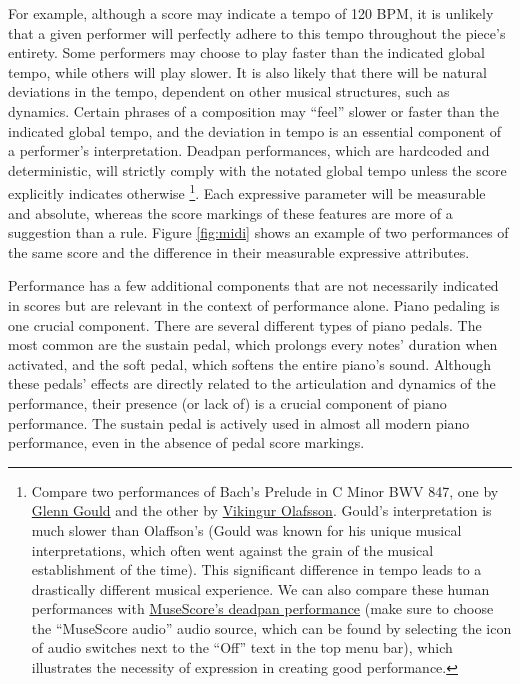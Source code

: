 For example, although a score may indicate a tempo of 120 BPM, it is unlikely that a given performer will perfectly adhere to this tempo throughout the piece's entirety. Some performers may choose to play faster than the indicated global tempo, while others will play slower. It is also likely that there will be natural deviations in the tempo, dependent on other musical structures, such as dynamics. Certain phrases of a composition may ``feel'' slower or faster than the indicated global tempo, and the deviation in tempo is an essential component of a performer's interpretation. Deadpan performances, which are hardcoded and deterministic, will strictly comply with the notated global tempo unless the score explicitly indicates otherwise%
\footnote{Compare two performances of Bach's Prelude in C Minor BWV 847, one by \href{https://www.youtube.com/watch?v=\_3MVZfLReo0}{Glenn Gould} and the other by \href{https://www.youtube.com/watch?v=CGVL5j6BEKs}{Vikingur Olafsson}. Gould's interpretation is much slower than Olaffson's (Gould was known for his unique musical interpretations, which often went against the grain of the musical establishment of the time). This significant difference in tempo leads to a drastically different musical experience. We can also compare these human performances with \href{https://musescore.com/user/30732005/scores/6062802}{MuseScore's deadpan performance} (make sure to choose the ``MuseScore audio'' audio source, which can be found by selecting the icon of audio switches next to the ``Off'' text in the top menu bar), which illustrates the necessity of expression in creating good performance.}. Each expressive parameter will be measurable and absolute, whereas the score markings of these features are more of a suggestion than a rule. Figure \ref{fig:midi} shows an example of two performances of the same score and the difference in their measurable expressive attributes. 

Performance has a few additional components that are not necessarily indicated in scores but are relevant in the context of performance alone. Piano pedaling is one crucial component. There are several different types of piano pedals. The most common are the sustain pedal, which prolongs every notes' duration when activated, and the soft pedal, which softens the entire piano's sound. Although these pedals' effects are directly related to the articulation and dynamics of the performance, their presence (or lack of) is a crucial component of piano performance. The sustain pedal is actively used in almost all modern piano performance, even in the absence of pedal score markings. 

